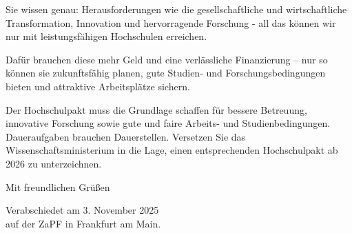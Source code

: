 \documentclass[DIV=calc]{scrartcl}
\begin{document}
Sie wissen genau: Herausforderungen wie die gesellschaftliche und wirtschaftliche Transformation, Innovation und hervorragende Forschung - all das können wir nur mit leistungsfähigen Hochschulen erreichen.

Dafür brauchen diese mehr Geld und eine verlässliche Finanzierung – nur so können sie zukunftsfähig planen, gute Studien- und Forschungsbedingungen bieten und attraktive Arbeitsplätze sichern.

Der Hochschulpakt muss die Grundlage schaffen für bessere Betreuung, innovative Forschung sowie gute und faire Arbeits- und Studienbedingungen. Daueraufgaben brauchen Dauerstellen. Versetzen Sie das Wissenschaftsministerium in die Lage, einen entsprechenden Hochschulpakt ab 2026 zu unterzeichnen.

Mit freundlichen Grüßen



%
\vfill
\begin{flushright}
	Verabschiedet am 3. November 2025 \\
	auf der ZaPF in Frankfurt am Main.
\end{flushright}
\end{document}
